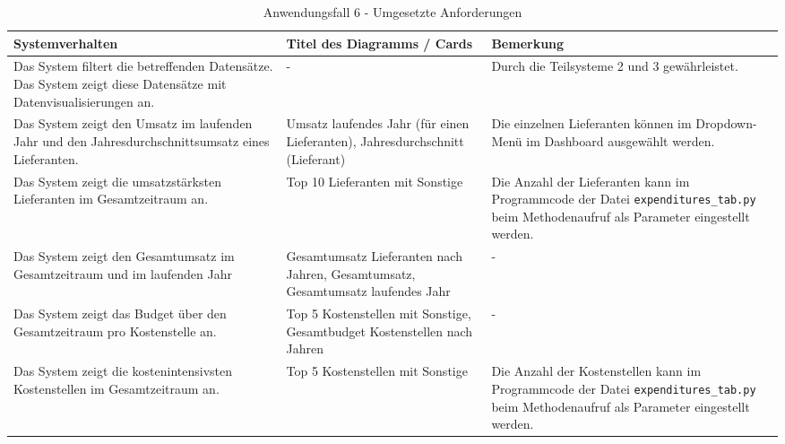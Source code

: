 \begingroup
    \setlength{\tabcolsep}{12pt} %
    \renewcommand{\arraystretch}{1.5} 
    \begin{table}[h]
        \centering
        \Large
        \begin{adjustbox}{max width=\textwidth}
        \begin{tabular}{p{}p{}p{}}
           \toprule
           Systemverhalten        &Titel des Diagramms / Cards&Bemerkung\\
           \midrule
           Das System filtert die betreffenden Datensätze. Das System zeigt diese Datensätze mit Datenvisualisierungen an.&-&Durch die Teilsysteme 2 und 3 gewährleistet.\\
           Das System zeigt den Umsatz im laufenden Jahr und den Jahresdurchschnittsumsatz eines Lieferanten.&Umsatz laufendes Jahr (für einen Lieferanten), Jahresdurchschnitt (Lieferant)&Die einzelnen Lieferanten können im Dropdown-Menü im Dashboard ausgewählt werden.\\
           Das System zeigt die umsatzstärksten Lieferanten im Gesamtzeitraum an.&Top 10 Lieferanten mit Sonstige  &Die Anzahl der Lieferanten kann im Programmcode der Datei \texttt{expenditures\_tab.py} beim Methodenaufruf als Parameter eingestellt werden.\\
           Das System zeigt den Gesamtumsatz im Gesamtzeitraum und im laufenden Jahr&Gesamtumsatz Lieferanten nach Jahren, Gesamtumsatz, Gesamtumsatz laufendes Jahr&-\\
           Das System zeigt das Budget über den Gesamtzeitraum pro Kostenstelle an.&Top 5 Kostenstellen mit Sonstige, Gesamtbudget Kostenstellen nach Jahren&-\\
           Das System zeigt die kostenintensivsten Kostenstellen im Gesamtzeitraum an.&Top 5 Kostenstellen mit Sonstige&Die Anzahl der Kostenstellen kann im Programmcode der Datei \texttt{expenditures\_tab.py} beim Methodenaufruf als Parameter eingestellt werden.\\
        \bottomrule
        \end{tabular}
        \end{adjustbox}
        \caption{%
            Anwendungsfall 6 - Umgesetzte Anforderungen
        }
        \label{tab:Anwendungsfall 6 - Umgesetzte Anforderungen}
        \end{table}
\endgroup
\clearpage
